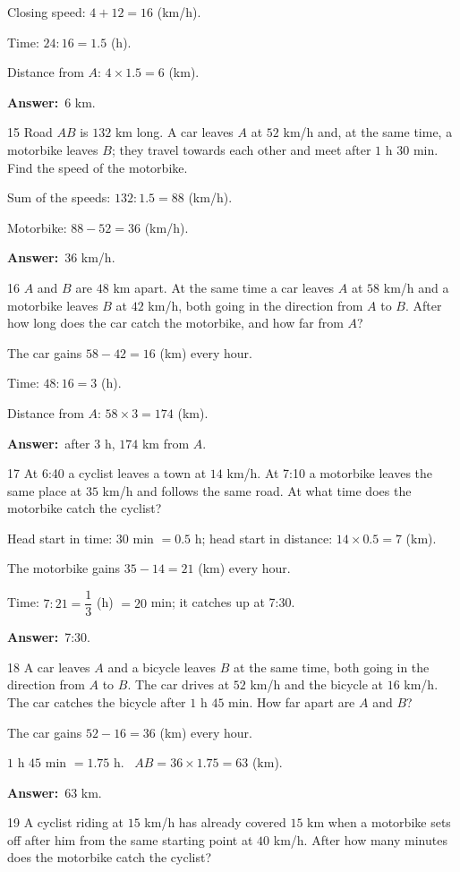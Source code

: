 \documentclass[11pt]{article}
\newif\ifsol \solfalse
\providecommand{\AnsWord}{Đáp số}
\newcommand{\dapso}[1]{\par\textbf{\AnsWord:}\ #1}
\newcommand{\probsol}[1]{%
  \begin{lrbox}{\solmeasure}\begin{minipage}{\dimexpr\linewidth-24pt\relax}#1\end{minipage}\end{lrbox}%
  \ifsol
    \begin{solbox}#1\end{solbox}%
  \else
    \setlength{\solht}{\dimexpr\ht\solmeasure+\dp\solmeasure+0.85cm\relax}%
    \ifdim\solht<1.35cm\setlength{\solht}{1.35cm}\fi
    \begin{tcolorbox}[colback=white,colframe=Line,boxrule=0.8pt,arc=5pt,
      left=8pt,right=8pt,top=4pt,bottom=4pt,height=\solht]{\footnotesize\color{Slate}\itshape\WorkWord}\end{tcolorbox}%
  \fi}
\newcommand{\gap}{\vspace{0.3cm}}
\def\WorkWord{Your work:}
\def\AnsWord{Answer}
\begin{document}
\probsol{
Closing speed: $4+12=16$ (km/h).\par Time: $24:16=1.5$ (h).\par Distance from $A$: $4\times1.5=6$ (km).
\dapso{$6$ km.}}
\gap
\begin{probbox}{15}{\relax}
Road $AB$ is $132$ km long. A car leaves $A$ at $52$ km/h and, at the same time, a motorbike leaves $B$; they travel towards each other and meet after $1$ h $30$ min. Find the speed of the motorbike.
\end{probbox}
\probsol{
Sum of the speeds: $132:1.5=88$ (km/h).\par Motorbike: $88-52=36$ (km/h).
\dapso{$36$ km/h.}}
\gap
\begin{probbox}{16}{\relax}
$A$ and $B$ are $48$ km apart. At the same time a car leaves $A$ at $58$ km/h and a motorbike leaves $B$ at $42$ km/h, both going in the direction from $A$ to $B$. After how long does the car catch the motorbike, and how far from $A$?
\end{probbox}
\probsol{
The car gains $58-42=16$ (km) every hour.\par Time: $48:16=3$ (h).\par Distance from $A$: $58\times3=174$ (km).
\dapso{after $3$ h, $174$ km from $A$.}}
\gap
\begin{probbox}{17}{\relax}
At 6:40 a cyclist leaves a town at $14$ km/h. At 7:10 a motorbike leaves the same place at $35$ km/h and follows the same road. At what time does the motorbike catch the cyclist?
\end{probbox}
\probsol{
Head start in time: $30$ min $=0.5$ h; head start in distance: $14\times0.5=7$ (km).\par
The motorbike gains $35-14=21$ (km) every hour.\par Time: $7:21=\dfrac13$ (h) $=20$ min; it catches up at 7:30.
\dapso{7:30.}}
\gap
\begin{probbox}{18}{\relax}
A car leaves $A$ and a bicycle leaves $B$ at the same time, both going in the direction from $A$ to $B$. The car drives at $52$ km/h and the bicycle at $16$ km/h. The car catches the bicycle after $1$ h $45$ min. How far apart are $A$ and $B$?
\end{probbox}
\probsol{
The car gains $52-16=36$ (km) every hour.\par $1$ h $45$ min $=1.75$ h. \ $AB=36\times1.75=63$ (km).
\dapso{$63$ km.}}
\gap
\begin{probbox}{19}{\relax}
A cyclist riding at $15$ km/h has already covered $15$ km when a motorbike sets off after him from the same starting point at $40$ km/h. After how many minutes does the motorbike catch the cyclist?
\end{probbox}
\end{document}

